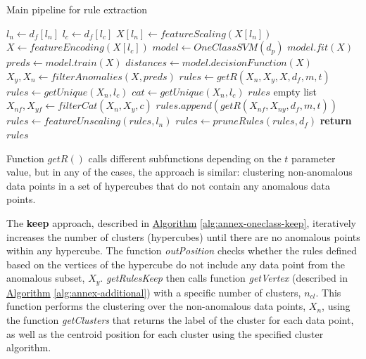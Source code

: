 \begin{algorithm}[]
\caption{Main pipeline for rule extraction}\label{alg:annex-oneclasssvmXAI}
\begin{algorithmic}[1]
    \State $ l_n \gets d_{f}[l_n]$
    \State $ l_c \gets d_{f}[l_c]$
    \State $X[l_n] \gets featureScaling(X[l_n])$
    \State $X \gets featureEncoding(X[l_c])$
    \State $model \gets OneClassSVM(d_{p})$
    \State $model.fit(X)$
    \State $preds \gets model.train(X)$
    \State $distances \gets model.decisionFunction(X)$
    \State $X_y, X_n \gets filterAnomalies(X, preds)$
        \State $rules \gets getR(X_n, X_y, X, d_{f}, m, t)$
        \State $rules \gets getUnique(X_n, l_c)$
    \Else
        \State $cat \gets getUnique(X_n, l_c)$
        \State $rules$ empty list
            \State $X_{nf}, X_{yf} \gets filterCat(X_n, X_y, c)$
            \State $rules.append(getR(X_{nf}, X_{ny}, d_{f}, m, t))$
        \EndFor\label{itercategory}
    \EndIf\label{obtainrules}
    \State $rules \gets featureUnscaling(rules, l_n)$
    \State $rules \gets pruneRules(rules, d_{f})$
    \State \textbf{return} $rules$
    \EndProcedure
\end{algorithmic}
\end{algorithm}

Function $getR()$ calls different subfunctions depending on the $t$ parameter value, but in any of the cases, the approach is similar: clustering non-anomalous data points in a set of hypercubes that do not contain any anomalous data points.

The \textbf{keep} approach, described in \hyperref[alg:annex-oneclass-keep]{Algorithm} \ref{alg:annex-oneclass-keep}, iteratively increases the number of clusters (hypercubes) until there are no anomalous points within any hypercube. The function \textit{outPosition} checks whether the rules defined based on the vertices of the hypercube do not include any data point from the anomalous subset, $X_y$. \textit{getRulesKeep} then calls function \textit{getVertex} (described in \hyperref[alg:annex-additional]{Algorithm} \ref{alg:annex-additional})  with a specific number of clusters, $n_{cl}$. This function performs the clustering over the non-anomalous data points, $X_n$, using the function \textit{getClusters} that returns the label of the cluster for each data point, as well as the centroid position for each cluster using the specified cluster algorithm.

